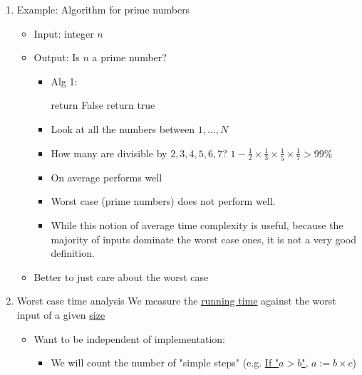 \documentclass[11pt]{article}
\begin{document}
\begin{enumerate}
\begin{itemize}
\end{itemize}
\item Example: Algorithm for prime numbers
\label{sec:orgeb626da}
\begin{itemize}
\item Input: integer \(n\)
\item Output: Is \(n\) a prime number?
\begin{itemize}
\item Alg 1:
\begin{algorithmic}
		    return False
		   \EndIf
	\EndFor
	\State return true
\end{algorithmic}
\item Look at all the numbers between \(1,\ldots, N\)
\item How many are divisible by \({2,3,4,5,6,7}\)? \(1-\frac{1}{2}\times \frac{1}{3}\times \frac{1}{5} \times \frac{1}{7}>99\%\)
\item On average performs well
\item Worst case (prime numbers) does not perform well.
\item While this notion of average time complexity is useful, because the majority of inputs dominate the worst case ones, it is not a very good definition.
\end{itemize}
\item Better to just care about the worst case
\end{itemize}
\item Worst case time analysis
\label{sec:org6e8c4cf}
We measure the \uline{running time} against the worst input of a given \uline{size}
\begin{itemize}
\item Want to be independent of implementation:
\begin{itemize}
\item We will count the number of "simple steps" (e.g. \uline{If "\(a>b\)"}, \(a:=b \times c\))
\end{itemize}
\end{itemize}
\end{enumerate}
\end{document}

